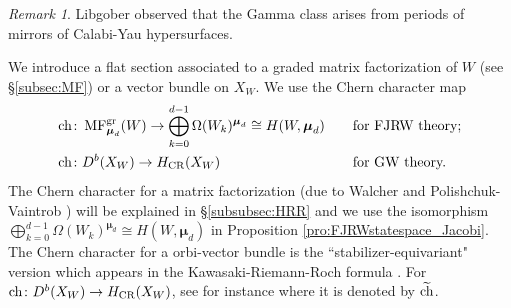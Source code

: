 \documentclass[11pt]{amsart}
\theoremstyle{definition} %
\theoremstyle{remark} %
\newtheorem{rem}[thm]{Remark}%
\newcommand{\ch}{{\rm ch}}
\def\MFhom{\operatorname{{MF}}}
\def\CR{\operatorname{\text{CR}}}
\newcommand{\bmu}{\boldsymbol{\mu}}
\renewcommand{\CR}{{\operatorname{CR}}}
\newcommand{\tch}{\widetilde{\ch}}
\begin{document}
\begin{rem} 
Libgober \cite{Libgober} observed that the Gamma class 
arises from periods of mirrors of Calabi-Yau hypersurfaces.  
\end{rem} 
We introduce a flat section associated to a
graded matrix factorization of $W$ 
(see \S \ref{subsec:MF}) 
or a vector bundle on $X_W$. 
We use the Chern character map 
\begin{alignat*}{2} 
\ch & \colon \MFhom^{\rm gr}_{\bmu_d}(W) \to \bigoplus_{k=0}^{d-1} 
\Omega(W_k)^{\bmu_d} \cong H(W,\bmu_d)  & \quad
& \text{for FJRW theory;}\\  
\ch & \colon D^b(X_W) \to H_{\CR}(X_W) & 
& \text{for GW theory.}
\end{alignat*} 
The Chern character for a matrix factorization 
(due to Walcher \cite{Walcher} and Polishchuk-Vaintrob \cite{PVmf}) 
will be explained in \S \ref{subsubsec:HRR} 
and we use the isomorphism 
$\bigoplus_{k=0}^{d-1}\Omega(W_k)^{\bmu_d} \cong H(W,\bmu_d)$ 
in Proposition \ref{pro:FJRWstatespace_Jacobi}. 
The Chern character for a orbi-vector bundle 
is the ``stabilizer-equivariant" version 
which appears in the Kawasaki-Riemann-Roch formula 
\cite{Kawasaki, Toen}. 
For $\ch\colon D^b(X_W) \to H_{\CR}(X_W)$, 
see for instance \cite[\S 2.4]{Ir} 
where it is denoted by $\tch$. 
\end{document}
